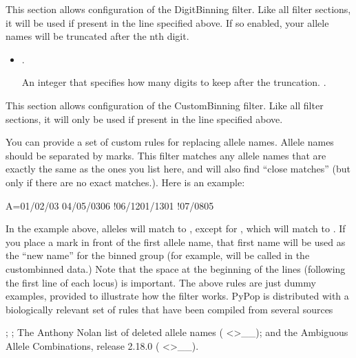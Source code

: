 \documentclass[letterpaper,10pt,english,openany,oneside]{sphinxmanual}
\begin{document}
\sphinxAtStartPar
This section allows configuration of the DigitBinning filter. Like all
filter sections, it will be used if present in the 
line specified above. If so enabled, your allele names will be truncated
after the nth digit.
\begin{itemize}
\item {} 
\sphinxAtStartPar
{}.

\sphinxAtStartPar
An integer that specifies how many digits to keep after the
truncation. \sphinxstylestrong{{[}Default:}  \sphinxstylestrong{{]}}.

\end{itemize}

\sphinxAtStartPar
\sphinxcode{\sphinxupquote{{[}CustomBinning{]}}} 

\sphinxAtStartPar
This section allows configuration of the CustomBinning filter. Like all
filter sections, it will only be used if present in the
 line specified above.

\sphinxAtStartPar
You can provide a set of custom rules for replacing allele names. Allele
names should be separated by \sphinxcode{\sphinxupquote{/}} marks. This filter matches any allele
names that are exactly the same as the ones you list here, and will also
find “close matches” (but only if there are no exact matches.). Here is
an example:

\begin{sphinxVerbatim}[commandchars=\\\{\}]
A=01/02/03
 04/05/0306
 !06/1201/1301
 !07/0805
\end{sphinxVerbatim}

\sphinxAtStartPar
In the example above,  alleles will match to ,
except for , which will match to . If you place
a \sphinxcode{\sphinxupquote{!}} mark in front of the first allele name, that first name will be
used as the “new name” for the binned group (for example, 
will be called  in the custom\sphinxhyphen{}binned data.) Note that the space at
the beginning of the lines (following the first line of each locus) is
important. The above rules are just dummy examples, provided to
illustrate how the filter works. PyPop is distributed with a
biologically relevant set of  rules that have been
compiled from several sources %
\begin{footnote}[2]\sphinxAtStartFootnote
{}; ; The Anthony Nolan list of deleted
allele names
(\textasciigrave{} \textless{}\textgreater{}\textasciigrave{}\_\_); and the
Ambiguous Allele Combinations, release 2.18.0
(\textasciigrave{} \textless{}\textgreater{}\textasciigrave{}\_\_).
%
\end{footnote}
\end{document}
